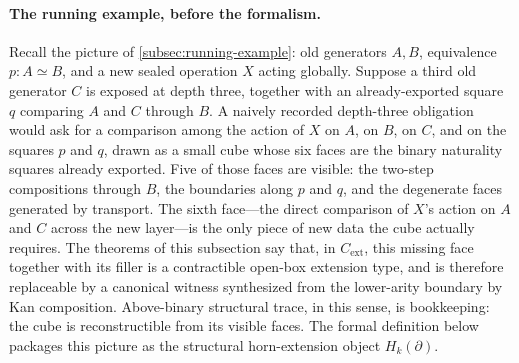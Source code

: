 \documentclass{lmcs}
\newcommand{\Cext}{C_{\mathrm{ext}}}
\begin{document}
\paragraph*{The running example, before the formalism.}
Recall the picture of \autoref{subsec:running-example}: old generators $A,B$, equivalence $p:A\simeq B$, and a new sealed operation $X$ acting globally. Suppose a third old generator $C$ is exposed at depth three, together with an already-exported square $q$ comparing $A$ and $C$ through $B$. A naively recorded depth-three obligation would ask for a comparison among the action of $X$ on $A$, on $B$, on $C$, and on the squares $p$ and $q$, drawn as a small cube whose six faces are the binary naturality squares already exported. Five of those faces are visible: the two-step compositions through $B$, the boundaries along $p$ and $q$, and the degenerate faces generated by transport. The sixth face---the direct comparison of $X$'s action on $A$ and $C$ across the new layer---is the only piece of new data the cube actually requires. The theorems of this subsection say that, in $\Cext$, this missing face together with its filler is a contractible open-box extension type, and is therefore replaceable by a canonical witness synthesized from the lower-arity boundary by Kan composition. Above-binary structural trace, in this sense, is bookkeeping: the cube is reconstructible from its visible faces. The formal definition below packages this picture as the structural horn-extension object $H_k(\partial)$.
\end{document}
